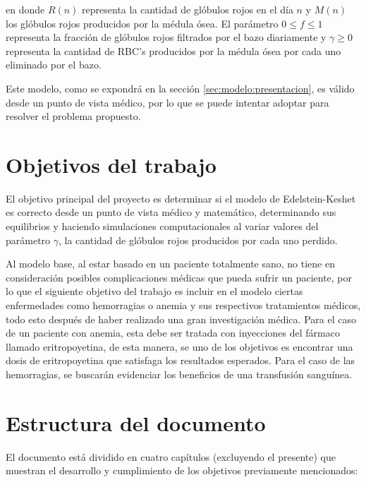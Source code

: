 en donde $R(n)$ representa la cantidad de glóbulos rojos en el día $n$ y $M(n)$ los glóbulos rojos producidos por la médula ósea. El parámetro $0\leq f \leq 1$ representa la fracción de glóbulos rojos filtrados por el bazo diariamente y $\gamma \geq 0$ representa la cantidad de RBC's producidos por la médula ósea por cada uno eliminado por el bazo. 

Este modelo, como se expondrá en la sección \ref{sec:modelo:presentacion}, es válido desde un punto de vista médico, por lo que se puede intentar adoptar para resolver el problema propuesto. 

\section{Objetivos del trabajo}

El objetivo principal del proyecto es determinar si el modelo de Edelstein-Keshet es correcto desde un punto de vista médico y matemático, determinando sus equilibrios y haciendo simulaciones computacionales al variar valores del parámetro $\gamma$, la cantidad de glóbulos rojos producidos por cada uno perdido.

Al modelo base, al estar basado en un paciente totalmente sano, no tiene en consideración posibles complicaciones médicas que pueda sufrir un paciente, por lo que el siguiente objetivo del trabajo es incluir en el modelo ciertas enfermedades como hemorragias o anemia y sus respectivos tratamientos médicos, todo esto después de haber realizado una gran investigación médica. Para el caso de un paciente con anemia, esta debe ser tratada con inyecciones del fármaco llamado eritropoyetina, de esta manera, se uno de los objetivos es encontrar una dosis de eritropoyetina que satisfaga los resultados esperados. Para el caso de las hemorragias, se buscarán evidenciar los beneficios de una transfusión sanguínea.

\section{Estructura del documento}

El documento está dividido en cuatro capítulos (excluyendo el presente) que muestran el desarrollo y cumplimiento de los objetivos previamente mencionados:

